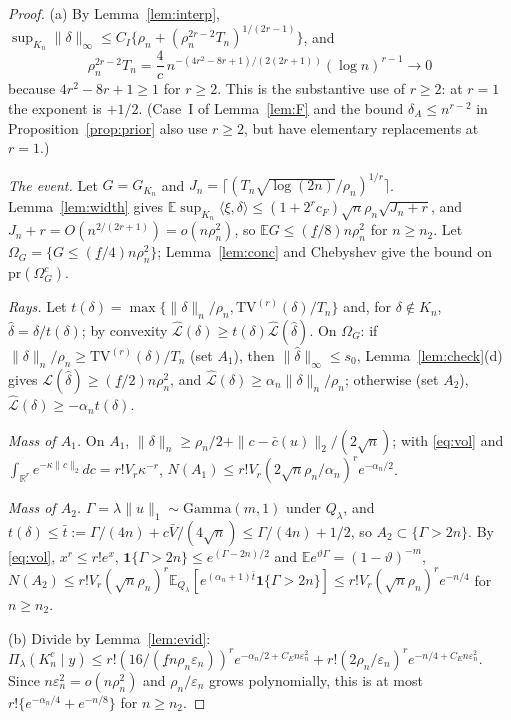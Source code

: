 \documentclass[11pt]{article}
\theoremstyle{definition}
\theoremstyle{remark}
\newcommand{\R}{\mathbb{R}}
\newcommand{\E}{\mathbb{E}}
\newcommand{\pr}{\mathrm{pr}}
\newcommand{\TV}{\mathrm{TV}}
\newcommand{\en}{\varepsilon_n}
\newcommand{\Lh}{\widehat{\mathcal L}}
\newcommand{\Lm}{\mathcal L}
\newcommand{\Ql}{Q_\lambda}
\newcommand{\fl}{\underline f}
\newcommand{\Vb}{\bar V}
\newcommand{\nn}[1]{\|#1\|_n}
\newcommand{\ind}{\mathbf 1}
\begin{document}
\begin{proof}
(a) By Lemma~\ref{lem:interp}, $\sup_{K_n}\|\delta\|_\infty\le C_I\{\rho_n+(\rho_n^{2r-2}T_n)^{1/(2r-1)}\}$, and
\[
\rho_n^{2r-2}T_n=\frac4c\,n^{-(4r^2-8r+1)/(2(2r+1))}(\log n)^{r-1}\to0
\]
because $4r^2-8r+1\ge1$ for $r\ge2$. This is the substantive use of $r\ge2$: at $r=1$ the exponent is $+1/2$. (Case~I of Lemma~\ref{lem:F} and the bound $\delta_A\le n^{r-2}$ in Proposition~\ref{prop:prior} also use $r\ge2$, but have elementary replacements at $r=1$.)

\emph{The event.} Let $G=G_{K_n}$ and $J_n=\lceil(T_n\sqrt{\log(2n)}/\rho_n)^{1/r}\rceil$. Lemma~\ref{lem:width} gives $\E\sup_{K_n}\langle\xi,\delta\rangle\le(1+2^rc_F)\sqrt n\rho_n\sqrt{J_n+r}$, and $J_n+r=O(n^{2/(2r+1)})=o(n\rho_n^2)$, so $\E G\le(\fl/8)n\rho_n^2$ for $n\ge n_2$. Let $\Omega_G=\{G\le(\fl/4)n\rho_n^2\}$; Lemma~\ref{lem:conc} and Chebyshev give the bound on $\pr(\Omega_G^c)$.

\emph{Rays.} Let $t(\delta)=\max\{\nn{\delta}/\rho_n,\TV^{(r)}(\delta)/T_n\}$ and, for $\delta\notin K_n$, $\hat\delta=\delta/t(\delta)$; by convexity $\Lh(\delta)\ge t(\delta)\Lh(\hat\delta)$. On $\Omega_G$: if $\nn{\delta}/\rho_n\ge\TV^{(r)}(\delta)/T_n$ (set $A_1$), then $\|\hat\delta\|_\infty\le s_0$, Lemma~\ref{lem:check}(d) gives $\Lm(\hat\delta)\ge(\fl/2)n\rho_n^2$, and $\Lh(\delta)\ge\alpha_n\nn{\delta}/\rho_n$; otherwise (set $A_2$), $\Lh(\delta)\ge-\alpha_nt(\delta)$.

\emph{Mass of $A_1$.} On $A_1$, $\nn{\delta}\ge\rho_n/2+\|c-\bar c(u)\|_2/(2\sqrt n)$; with \eqref{eq:vol} and $\int_{\R^r}e^{-\kappa\|c\|_2}dc=r!V_r\kappa^{-r}$, $N(A_1)\le r!V_r(2\sqrt n\rho_n/\alpha_n)^re^{-\alpha_n/2}$.

\emph{Mass of $A_2$.} $\Gamma=\lambda\|u\|_1\sim\mathrm{Gamma}(m,1)$ under $\Ql$, and $t(\delta)\le\bar t:=\Gamma/(4n)+c\Vb/(4\sqrt n)\le\Gamma/(4n)+1/2$, so $A_2\subset\{\Gamma>2n\}$. By \eqref{eq:vol}, $x^r\le r!e^x$, $\ind\{\Gamma>2n\}\le e^{(\Gamma-2n)/2}$ and $\E e^{\vartheta\Gamma}=(1-\vartheta)^{-m}$,
$N(A_2)\le r!V_r(\sqrt n\rho_n)^r\E_{\Ql}[e^{(\alpha_n+1)\bar t}\ind\{\Gamma>2n\}]\le r!V_r(\sqrt n\rho_n)^re^{-n/4}$ for $n\ge n_2$.

(b) Divide by Lemma~\ref{lem:evid}: $\Pi_\lambda(K_n^c\mid y)\le r!(16/(\fl n\rho_n\en))^re^{-\alpha_n/2+C_En\en^2}+r!(2\rho_n/\en)^re^{-n/4+C_En\en^2}$. Since $n\en^2=o(n\rho_n^2)$ and $\rho_n/\en$ grows polynomially, this is at most $r!\{e^{-\alpha_n/4}+e^{-n/8}\}$ for $n\ge n_2$.
\end{proof}
\end{document}
